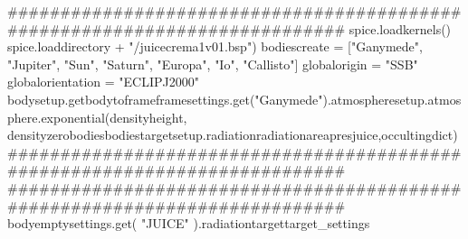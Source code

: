 {}
\markdownRendererSectionEnd \markdownRendererSectionBegin
{}\markdownRendererInterblockSeparator
{}###########################################################################\markdownRendererInterblockSeparator
{}
\markdownRendererSectionEnd \markdownRendererSectionBegin
{}\markdownRendererInterblockSeparator
{}spice.loadkernels() spice.loaddirectory + "/juicecrema1v01.bsp")\markdownRendererInterblockSeparator
{}
\markdownRendererSectionEnd \markdownRendererSectionBegin
{}\markdownRendererInterblockSeparator
{}bodiescreate = ["Ganymede", "Jupiter", "Sun", "Saturn", "Europa", "Io", "Callisto"] globalorigin = "SSB" globalorientation = "ECLIPJ2000" bodysetup.getbodytoframeframesettings.get("Ganymede").atmospheresetup.atmosphere.exponential(densityheight, densityzerobodiesbodiestargetsetup.radiationradiationareapresjuice,occultingdict)\markdownRendererInterblockSeparator
{}###########################################################################\markdownRendererInterblockSeparator
{}
\markdownRendererSectionEnd \markdownRendererSectionBegin
{}\markdownRendererInterblockSeparator
{}########################################################################### bodyemptysettings.get( "JUICE" ).radiationtargettarget_settings\markdownRendererInterblockSeparator
